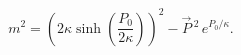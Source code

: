 \begin{equation}\label{1}
 m^2 = \left(2\kappa \sinh \left(\frac{P_0}{2\kappa}\right)\right)^2 - \vec{P}\,{}^2\, e^{P_0/\kappa}.
\end{equation}

